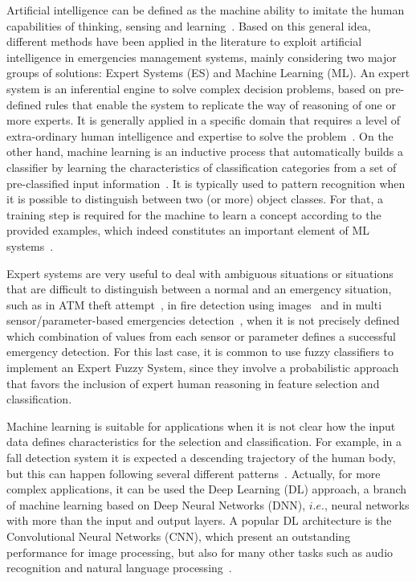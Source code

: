 \begin{refsection}
Artificial intelligence can be defined as the machine ability to imitate the human capabilities of thinking, sensing and learning~\cite{ExpertFire2}. Based on this general idea, different methods have been applied in the literature to exploit artificial intelligence in emergencies management systems, mainly considering two major groups of solutions: Expert Systems (ES) and Machine Learning (ML). An expert system is an inferential engine to solve complex decision problems, based on pre-defined rules that enable the system to replicate the way of reasoning of one or more experts. It is generally applied in a specific domain that requires a level of extra-ordinary human intelligence and expertise to solve the problem~\cite{ExpertFuzzy}. On the other hand, machine learning is an inductive process that automatically builds a classifier by learning the characteristics of classification categories from a set of pre-classified input information~\cite{SocialMachineLearningSurvey}. It is typically used to pattern recognition when it is possible to distinguish between two (or more) object classes. For that, a training step is required for the machine to learn a concept according to the provided examples, which indeed constitutes an important element of ML systems~\cite{machineIoT}.

Expert systems are very useful to deal with ambiguous situations or situations that are difficult to distinguish between a normal and an emergency situation, such as in ATM theft attempt~\cite{machine1}, in fire detection using images~\cite{ExpertFire1} and in multi sensor/parameter-based emergencies detection~\cite{ExpertFire2,FuzzyWater1}, when it is not precisely defined which combination of values from each sensor or parameter defines a successful emergency detection. For this last case, it is common to use fuzzy classifiers to implement an Expert Fuzzy System, since they involve a probabilistic approach that favors the inclusion of expert human reasoning in feature selection and classification.

Machine learning is suitable for applications when it is not clear how the input data defines characteristics for the selection and classification. For example, in a fall detection system it is expected a descending trajectory of the human body, but this can happen following several different patterns~\cite{cnn1,MachineVideoFall}. Actually, for more complex applications, it can be used the Deep Learning (DL) approach, a branch of machine learning based on Deep Neural Networks (DNN), $i.e.$, neural networks with more than the input and output layers. A popular DL architecture is the Convolutional Neural Networks (CNN), which present an outstanding performance for image processing, but also for many other tasks such as audio recognition and natural language processing~\cite{cnn1,CNNFireVideo,MachineCovidVoice}. 


\end{refsection}
